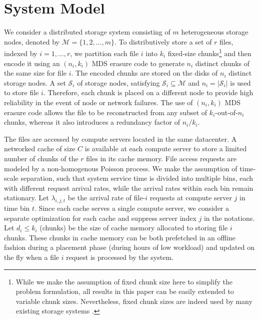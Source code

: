 

\section{System Model}

We consider a distributed storage system consisting of $m$ heterogeneous storage nodes, denoted by $\mathcal{M}=\{1,2,\ldots,m\}$. To distributively store a set of $r$ files, indexed by $i=1,\ldots,r$, we partition each file $i$ into $k_i$ fixed-size chunks\footnote{While we make the assumption of fixed chunk size here to simplify the problem formulation, all results in this paper can be easily extended to variable chunk sizes. Nevertheless, fixed chunk sizes are indeed used by many existing storage systems \cite{DPR04,AJX05,LC02}.} and then encode it using an $(n_i,k_i)$ MDS erasure code to generate $n_i$ distinct chunks of the same size for file $i$. The encoded chunks are stored on the disks of $n_i$ distinct storage nodes. A set $\mathcal{S}_i$ of storage nodes, satisfying $\mathcal{S}_i\subseteq\mathcal{M}$ and $n_i=|\mathcal{S}_i|$ is used to store file $i$. Therefore, each chunk is placed on a different node to provide high reliability in the event of node or network failures. The use of $(n_i,k_i)$ MDS erasure code allows the file to be reconstructed from any subset of $k_i$-out-of-$n_i$ chunks, whereas it also introduces a redundancy factor of $n_i/k_i$.

The files are accessed by compute servers located in the same datacenter. A networked cache of size $C$ is available at each compute server to store a limited number of chunks of the $r$ files in its cache memory. File access requests are modeled by a non-homogenous Poisson process. We make the assumption of time-scale separation, such that system service time is divided into multiple bins, each with different request arrival rates, while the arrival rates within each bin remain stationary. Let $\lambda_{i,j,t}$ be the arrival rate of file-$i$ requests at compute server $j$ in time bin $t$. Since each cache serves a single compute server, we consider a separate optimization for each cache and suppress server index $j$ in the notations. Let $d_i\le k_i$ (chunks) be the size of cache memory allocated to storing file $i$ chunks. These chunks in cache memory can be both prefetched in an offline fashion during a placement phase \cite{td_cache} (during hours of low workload) and updated on the fly when a file $i$ request is processed by the system.


